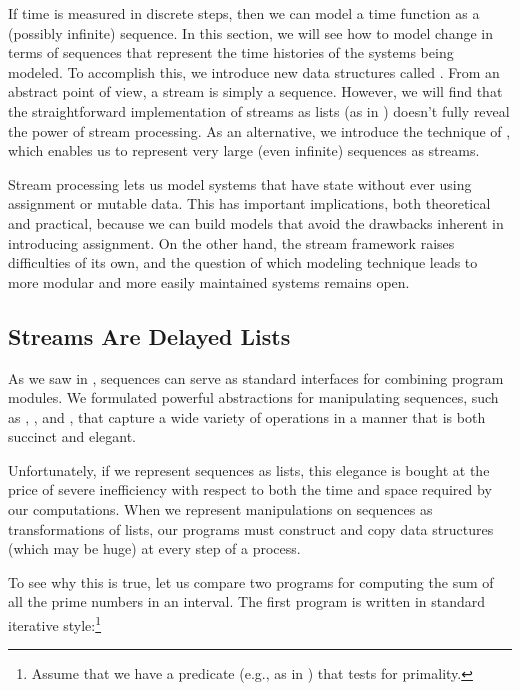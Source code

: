 If time is measured in discrete steps, then we can model a time function as a
(possibly infinite) sequence.  In this section, we will see how to model change
in terms of sequences that represent the time histories of the systems being
modeled.  To accomplish this, we introduce new data structures called
.  From an abstract point of view, a stream is simply a
sequence.  However, we will find that the straightforward implementation of
streams as lists (as in ) doesn't fully reveal the power of
stream processing.  As an alternative, we introduce the technique of
, which enables us to represent very large (even
infinite) sequences as streams.

Stream processing lets us model systems that have state without ever using
assignment or mutable data.  This has important implications, both theoretical
and practical, because we can build models that avoid the drawbacks inherent in
introducing assignment.  On the other hand, the stream framework raises
difficulties of its own, and the question of which modeling technique leads to
more modular and more easily maintained systems remains open.



\subsection{Streams Are Delayed Lists}
\label{Section 3.5.1}

As we saw in , sequences can serve as standard interfaces
for combining program modules.  We formulated powerful abstractions for
manipulating sequences, such as , , and
, that capture a wide variety of operations in a manner that
is both succinct and elegant.

Unfortunately, if we represent sequences as lists, this elegance is bought at
the price of severe inefficiency with respect to both the time and space
required by our computations.  When we represent manipulations on sequences as
transformations of lists, our programs must construct and copy data structures
(which may be huge) at every step of a process.

To see why this is true, let us compare two programs for computing the sum of
all the prime numbers in an interval.  The first program is written in standard
iterative style:\footnote{Assume that we have a predicate  (e.g.,
as in ) that tests for primality.}

